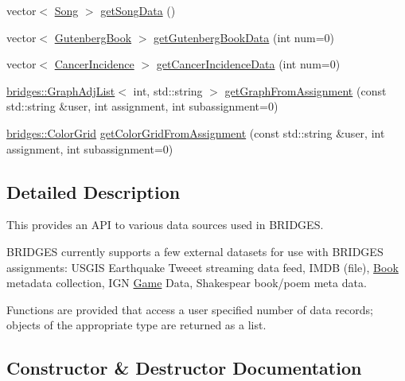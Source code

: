 \begin{DoxyCompactItemize}
vector$<$ \hyperlink{classbridges_1_1_song}{Song} $>$ \hyperlink{classbridges_1_1_data_source_a5e8d035a1becf96c71569e0966e93849}{get\+Song\+Data} ()
\item 
vector$<$ \hyperlink{classbridges_1_1_gutenberg_book}{Gutenberg\+Book} $>$ \hyperlink{classbridges_1_1_data_source_a1057509d6adf4cbfd881854adb274304}{get\+Gutenberg\+Book\+Data} (int num=0)
\item 
vector$<$ \hyperlink{classbridges_1_1_cancer_incidence}{Cancer\+Incidence} $>$ \hyperlink{classbridges_1_1_data_source_a52d8161e7c093ab3615acea7085f6689}{get\+Cancer\+Incidence\+Data} (int num=0)
\item 
\hyperlink{classbridges_1_1_graph_adj_list}{bridges\+::\+Graph\+Adj\+List}$<$ int, std\+::string $>$ \hyperlink{classbridges_1_1_data_source_ac4edf55c163c60f17b13f5499e5d2e65}{get\+Graph\+From\+Assignment} (const std\+::string \&user, int assignment, int subassignment=0)
\item 
\hyperlink{classbridges_1_1_color_grid}{bridges\+::\+Color\+Grid} \hyperlink{classbridges_1_1_data_source_aa65136879011e1ec237380ef8587fea2}{get\+Color\+Grid\+From\+Assignment} (const std\+::string \&user, int assignment, int subassignment=0)
\end{DoxyCompactItemize}


\subsection{Detailed Description}
This provides an A\+P\+I to various data sources used in B\+R\+I\+D\+G\+E\+S. 

B\+R\+I\+D\+G\+E\+S currently supports a few external datasets for use with B\+R\+I\+D\+G\+E\+S assignments\+: U\+S\+G\+I\+S Earthquake Tweeet streaming data feed, I\+M\+D\+B (file), \hyperlink{classbridges_1_1_book}{Book} metadata collection, I\+G\+N \hyperlink{classbridges_1_1_game}{Game} Data, Shakespear book/poem meta data.

Functions are provided that access a user specified number of data records; objects of the appropriate type are returned as a list. 

\subsection{Constructor \& Destructor Documentation}
\hypertarget{classbridges_1_1_data_source_afc95b52d2ca03a92c1f1ee1594a097c7}{}
